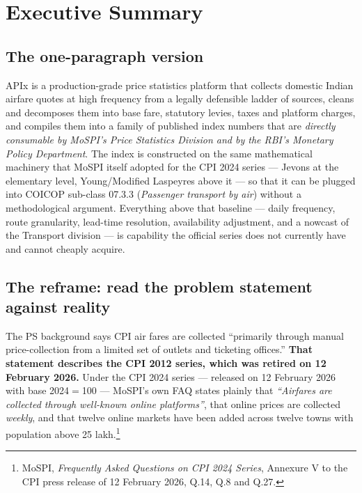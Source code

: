\chapter{Executive Summary}

\section{The one-paragraph version}

APIx is a production-grade price statistics platform that collects domestic Indian
airfare quotes at high frequency from a legally defensible ladder of sources, cleans and
decomposes them into base fare, statutory levies, taxes and platform charges, and
compiles them into a family of published index numbers that are \emph{directly consumable
by MoSPI's Price Statistics Division and by the RBI's Monetary Policy Department}. The
index is constructed on the same mathematical machinery that MoSPI itself adopted for the
CPI 2024 series --- Jevons at the elementary level, Young/Modified Laspeyres above it ---
so that it can be plugged into COICOP sub-class 07.3.3 (\emph{Passenger transport by air})
without a methodological argument. Everything above that baseline --- daily frequency,
route granularity, lead-time resolution, availability adjustment, and a nowcast of the
Transport division --- is capability the official series does not currently have and
cannot cheaply acquire.

\section{The reframe: read the problem statement against reality}

\begin{redbox}
\par\vspace{4pt}
The PS background says CPI air fares are collected ``primarily through manual
price-collection from a limited set of outlets and ticketing offices.'' \textbf{That
statement describes the CPI 2012 series, which was retired on 12 February 2026.} Under
the CPI 2024 series --- released on 12 February 2026 with base 2024$=$100 --- MoSPI's own
FAQ states plainly that \emph{``Airfares are collected through well-known online
platforms''}, that online prices are collected \emph{weekly}, and that twelve online
markets have been added across twelve towns with population above 25 lakh.\footnote{MoSPI,
\emph{Frequently Asked Questions on CPI 2024 Series}, Annexure V to the CPI press release
of 12 February 2026, Q.14, Q.8 and Q.27.}
\end{redbox}

